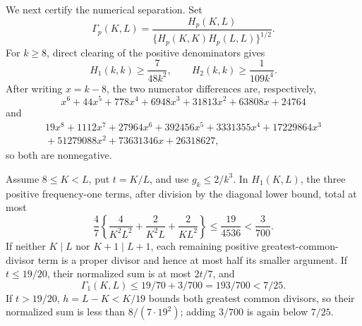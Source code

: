 We next certify the numerical separation.  Set
\[
 \Gamma_p(K,L)=\frac{H_p(K,L)}{\{H_p(K,K)H_p(L,L)\}^{1/2}}.
\]
For \(k\geq8\), direct clearing of the positive denominators gives
\[
 H_1(k,k)\geq\frac7{48k^2},\qquad H_2(k,k)\geq\frac1{109k^4}.
\]
After writing \(x=k-8\), the two numerator differences are, respectively,
\[
 x^6+44x^5+778x^4+6948x^3+31813x^2+63808x+24764
\]
and
\[
 \begin{aligned}
 19x^8+1112x^7+27964x^6+392456x^5+3331355x^4
 +17229864x^3\\
 {}+51279088x^2+73631346x+26318627,
 \end{aligned}
\]
so both are nonnegative.

Assume \(8\leq K<L\), put \(t=K/L\), and use \(g_k\leq2/k^3\).  In \(H_1(K,L)\), the three positive frequency-one terms, after division by the diagonal lower bound, total at most
\[
 \frac47\left\{\frac4{K^2L^2}+\frac2{K^2L}+\frac2{KL^2}\right\}
 \leq\frac{19}{4536}<\frac3{700}.
\]
If neither \(K\mid L\) nor \(K+1\mid L+1\), each remaining positive greatest-common-divisor term is a proper divisor and hence at most half its smaller argument.  If \(t\leq19/20\), their normalized sum is at most \(2t/7\), and
\[
 \Gamma_1(K,L)\leq19/70+3/700=193/700<7/25.
\]
If \(t>19/20\), \(h=L-K<K/19\) bounds both greatest common divisors, so their normalized sum is less than \(8/(7\cdot19^2)\); adding \(3/700\) is again below \(7/25\).

